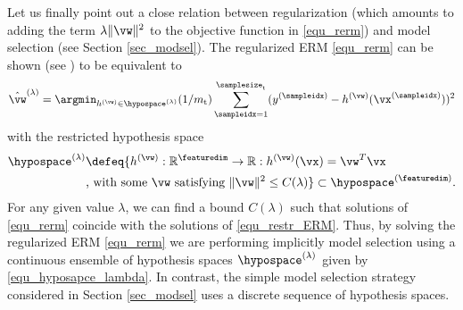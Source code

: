 \documentclass[12pt]{report}
\begin{document}
Let us finally point out a close relation between regularization (which amounts to 
adding the term $\lambda \| \vw \|^{2}$ to the objective function in \eqref{equ_rerm}) 
and model selection (see Section \ref{sec_modsel}). The regularized ERM \eqref{equ_rerm} 
can be shown (see \cite[Ch. 5]{BertsekasNonLinProgr}) to be equivalent to 
\begin{equation} 
\label{equ_restr_ERM}
\hat{\vw}^{(\lambda)} = \argmin_{h^{(\vw)} \in \hypospace^{(\lambda)}}  (1/m_{\rm t}) \sum_{\sampleidx=1}^{\samplesize_{\rm t}}  (y^{(\sampleidx)} - h^{(\vw)}(\vx^{(\sampleidx)})  )^2
\end{equation}  
with the restricted hypothesis space
\begin{align} 
\label{equ_hyposapce_lambda}
\hypospace^{(\lambda)} & \defeq \{ h^{(\vw)}: \mathbb{R}^{\featuredim} \rightarrow \mathbb{R}: h^{(\vw)}(\vx) = \vw^{T} \vx \nonumber \\
& \mbox{, with some } \vw \mbox{ satisfying } \| \vw \|^{2} \leq C(\lambda) \} \subset \hypospace^{(\featuredim)}. 
\end{align} 
For any given value $\lambda$, we can find a bound $C(\lambda)$ such that 
solutions of \eqref{equ_rerm} coincide with the solutions of \eqref{equ_restr_ERM}. 
Thus, by solving the regularized ERM \eqref{equ_rerm} we are performing implicitly 
model selection using a continuous ensemble of hypothesis spaces $\hypospace^{(\lambda)}$ 
given by \eqref{equ_hyposapce_lambda}. In contrast, the simple model selection strategy 
considered in Section \ref{sec_modsel} uses a discrete sequence of hypothesis spaces.   
\end{document}
